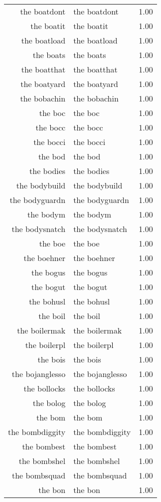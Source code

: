 \begin{table}[ht]
\begin{tabular}{rlr}
  the boatdont & the boatdont & 1.00 \\ 
  the boatit & the boatit & 1.00 \\ 
  the boatload & the boatload & 1.00 \\ 
  the boats & the boats & 1.00 \\ 
  the boatthat & the boatthat & 1.00 \\ 
  the boatyard & the boatyard & 1.00 \\ 
  the bobachin & the bobachin & 1.00 \\ 
  the boc & the boc & 1.00 \\ 
  the bocc & the bocc & 1.00 \\ 
  the bocci & the bocci & 1.00 \\ 
  the bod & the bod & 1.00 \\ 
  the bodies & the bodies & 1.00 \\ 
  the bodybuild & the bodybuild & 1.00 \\ 
  the bodyguardn & the bodyguardn & 1.00 \\ 
  the bodym & the bodym & 1.00 \\ 
  the bodysnatch & the bodysnatch & 1.00 \\ 
  the boe & the boe & 1.00 \\ 
  the boehner & the boehner & 1.00 \\ 
  the bogus & the bogus & 1.00 \\ 
  the bogut & the bogut & 1.00 \\ 
  the bohusl & the bohusl & 1.00 \\ 
  the boil & the boil & 1.00 \\ 
  the boilermak & the boilermak & 1.00 \\ 
  the boilerpl & the boilerpl & 1.00 \\ 
  the bois & the bois & 1.00 \\ 
  the bojanglesso & the bojanglesso & 1.00 \\ 
  the bollocks & the bollocks & 1.00 \\ 
  the bolog & the bolog & 1.00 \\ 
  the bom & the bom & 1.00 \\ 
  the bombdiggity & the bombdiggity & 1.00 \\ 
  the bombest & the bombest & 1.00 \\ 
  the bombshel & the bombshel & 1.00 \\ 
  the bombsquad & the bombsquad & 1.00 \\ 
  the bon & the bon & 1.00 \\ 

\end{tabular}
\end{table}
